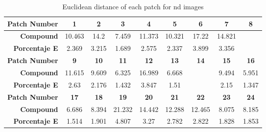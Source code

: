 \begin{table}[H]
  \caption{Euclidean distance of each patch for nd images }
  \begin{center}
    \begin{tabularx}{\textwidth}{r c c c c c c c c}
    \toprule
        \textbf{Patch Number} & \textbf{1} & \textbf{2} & \textbf{3} & \textbf{4} & \textbf{5} & \textbf{6} & \textbf{7} & \textbf{8}\\ \midrule 
        \textbf{Compound} &10.463 &14.2 &7.459 &11.373 &10.321 &17.22 &14.821 &\cellcolor{colorred}{21.988}\\ 
        \textbf{Porcentaje E} &2.369 &3.215 &1.689 &2.575 &2.337 &3.899 &3.356 &\cellcolor{colorred}{4.978}\\ \midrule 
        \textbf{Patch Number} & \textbf{9} & \textbf{10} & \textbf{11} & \textbf{12} & \textbf{13} & \textbf{14} & \textbf{15} & \textbf{16}\\ \midrule 
        \textbf{Compound} &11.615 &9.609 &6.325 &16.989 &6.668 &\cellcolor{colorgreen}{5.001} &9.494 &5.951\\ 
        \textbf{Porcentaje E} &2.63 &2.176 &1.432 &3.847 &1.51 &\cellcolor{colorgreen}{1.132} &2.15 &1.347\\ \midrule 
        \textbf{Patch Number} & \textbf{17} & \textbf{18} & \textbf{19} & \textbf{20} & \textbf{21} & \textbf{22} & \textbf{23} & \textbf{24}\\ \midrule 
        \textbf{Compound} &6.686 &8.394 &21.232 &14.442 &12.288 &12.465 &8.075 &8.185\\ 
        \textbf{Porcentaje E} &1.514 &1.901 &4.807 &3.27 &2.782 &2.822 &1.828 &1.853\\ \midrule 
    \bottomrule
    \end{tabularx}
  \end{center}
\end{table}
